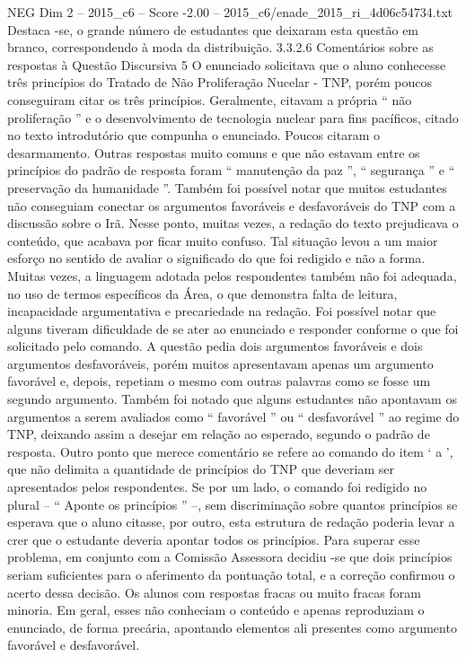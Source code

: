 \begin{textsample}{NEG Dim 2 – 2015\_c6 – Score -2.00 – 2015\_c6/enade\_2015\_ri\_4d06c54734.txt}
Destaca -se, o grande número de estudantes que deixaram esta questão em branco, correspondendo à moda da distribuição. 3.3.2.6 Comentários sobre as respostas à Questão Discursiva 5 O enunciado solicitava que o aluno conhecesse três princípios do Tratado de Não Proliferação Nucelar - TNP, porém poucos conseguiram citar os três princípios.
Geralmente, citavam a própria “ não proliferação ” e o desenvolvimento de tecnologia nuclear para fins pacíficos, citado no texto introdutório que compunha o enunciado.
Poucos citaram o desarmamento.
Outras respostas muito comuns e que não estavam entre os princípios do padrão de resposta foram “ manutenção da paz ”, “ segurança ” e “ preservação da humanidade ”.
Também foi possível notar que muitos estudantes não conseguiam conectar os argumentos favoráveis e desfavoráveis do TNP com a discussão sobre o Irã.
Nesse ponto, muitas vezes, a redação do texto prejudicava o conteúdo, que acabava por ficar muito confuso.
Tal situação levou a um maior esforço no sentido de avaliar o significado do que foi redigido e não a forma.
Muitas vezes, a linguagem adotada pelos respondentes também não foi adequada, no uso de termos específicos da Área, o que demonstra falta de leitura, incapacidade argumentativa e precariedade na redação.
Foi possível notar que alguns tiveram dificuldade de se ater ao enunciado e responder conforme o que foi solicitado pelo comando.
A questão pedia dois argumentos favoráveis e dois argumentos desfavoráveis, porém muitos apresentavam apenas um argumento favorável e, depois, repetiam o mesmo com outras palavras como se fosse um segundo argumento.
Também foi notado que alguns estudantes não apontavam os argumentos a serem avaliados como “ favorável ” ou “ desfavorável ” ao regime do TNP, deixando assim a desejar em relação ao esperado, segundo o padrão de resposta.
Outro ponto que merece comentário se refere ao comando do item ‘ a ’, que não delimita a quantidade de princípios do TNP que deveriam ser apresentados pelos respondentes.
Se por um lado, o comando foi redigido no plural – “ Aponte os princípios ” –, sem discriminação sobre quantos princípios se esperava que o aluno citasse, por outro, esta estrutura de redação poderia levar a crer que o estudante deveria apontar todos os princípios.
Para superar esse problema, em conjunto com a Comissão Assessora decidiu -se que dois princípios seriam suficientes para o aferimento da pontuação total, e a correção confirmou o acerto dessa decisão.
Os alunos com respostas fracas ou muito fracas foram minoria.
Em geral, esses não conheciam o conteúdo e apenas reproduziam o enunciado, de forma precária, apontando elementos ali presentes como argumento favorável e desfavorável.

\end{textsample}
